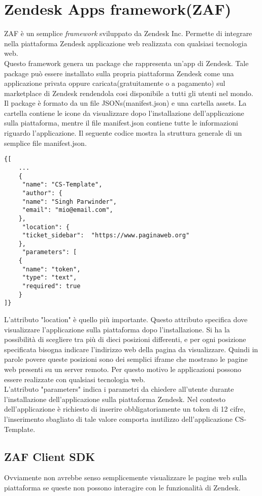 \section{Zendesk Apps framework(ZAF)}
ZAF è un semplice \emph{framework} sviluppato da Zendesk Inc. Permette di integrare nella piattaforma Zendesk applicazione web realizzata con qualsiasi tecnologia web. 
\\

Questo framework genera un package che rappresenta un'app di Zendesk.
Tale package può essere installato sulla propria piattaforma Zendesk come una applicazione privata oppure caricata(gratuitamente o a pagamento) sul marketplace di Zendesk rendendola cosi disponibile a tutti gli utenti nel mondo. Il package è formato da un file \glspl{JSON}(manifest.json) e una cartella assets. La cartella contiene le icone da visualizzare dopo l'installazione dell'applicazione sulla piattaforma, mentre il file manifest.json contiene tutte le informazioni riguardo l'applicazione. Il seguente codice mostra la struttura generale di un semplice file manifest.json. \\
\begin{lstlisting}
{[
	...
	{
	 "name": "CS-Template",
	 "author": {
	 "name": "Singh Parwinder",
	 "email": "mio@email.com",
	},
	 "location": {
	 "ticket_sidebar":  "https://www.paginaweb.org"
	},	
	 "parameters": [
	{
	 "name": "token",
	 "type": "text",
	 "required": true
	}
]}

\end{lstlisting}
L'attributo "location" è quello più importante. Questo attributo specifica dove visualizzare l'applicazione sulla piattaforma dopo l'installazione. Si ha la possibilità di scegliere tra più di dieci posizioni differenti, e per ogni posizione specificata bisogna indicare l'indirizzo web della pagina da visualizzare. Quindi in parole povere queste posizioni sono dei semplici \gls{iframe} che mostrano le pagine web presenti su un server remoto.   Per questo motivo le applicazioni possono essere realizzate con qualsiasi tecnologia web. 
\\

L'attributo "parameters" indica i parametri da chiedere all'utente durante l'installazione dell'applicazione sulla piattaforma Zendesk. Nel contesto dell'applicazione è richiesto di inserire obbligatoriamente un token di 12 cifre, l'inserimento sbagliato di tale valore comporta inutilizzo dell'applicazione CS-Template. 

\subsection{ZAF Client SDK}
Ovviamente non avrebbe senso semplicemente visualizzare le pagine web sulla piattaforma se queste non possono interagire con le funzionalità di Zendesk. 
\\

